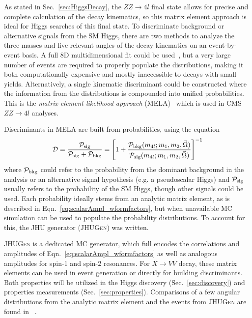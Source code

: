 As stated in Sec.~\ref{sec:HiggsDecay}, the $ZZ\rightarrow 4l$ final state allows for precise and complete calculation of the decay kinematics, so this matrix element approach is ideal for Higgs searches of this final state. To discriminate background or alternative signals from the SM Higgs, there are two methods to analyze the three masses and five relevant angles of the decay kinematics on an event-by-event basis. A full 8D multidimensional fit could be used~\cite{Chen:2014pia}, but a very large number of events are required to properly populate the distributions, making it both computationally expensive and mostly inaccessible to decays with small yields. Alternatively, a single kinematic discriminant could be constructed where the information from the distributions is compounded into unified probabilities. This is the \textit{matrix element likelihood approach} (MELA)~\cite{Gao:2010qx,Bolognesi:2012mm} which is used in CMS $ZZ\rightarrow 4l$ analyses.

Discriminants in MELA are built from probabilities, using the equation
\begin{equation}
\mathcal{D} = \frac{\mathcal{P}_{\rm{sig}}}{\mathcal{P}_{\rm{sig}} + \mathcal{P}_{\rm{bkg}}} = \left[1+ \frac{\mathcal{P}_{\rm{bkg}}(m_{4l};m_1,m_2,\vec{\Omega})}{\mathcal{P}_{\rm{sig}}(m_{4l};m_1,m_2,\vec{\Omega})}\right]^{-1}
\label{eq:MELADisc}
\end{equation}
where $\mathcal{P}_{\rm{bkg}}$ could refer to the probability from the dominant background in the analysis or an alternative signal hypothesis (e.g. a pseudoscalar Higgs) and $\mathcal{P}_{\rm{sig}}$ usually refers to the probability of the SM Higgs, though other signals could be used. Each probability ideally stems from an analytic matrix element, as is described in Eqn.~\ref{eq:scalarAmpl_wformfactors}, but when unavailable MC simulation can be used to populate the probability distributions. To account for this, the \textsc{JHU} generator (\textsc{JHUGen}) was written.

\textsc{JHUGen} is a dedicated MC generator, which full encodes the correlations and amplitudes of Eqn.~\ref{eq:scalarAmpl_wformfactors} as well as analogous amplitudes for spin-1 and spin-2 resonances. For $X\rightarrow VV$ decay, these matrix elements can be used in event generation or directly for building discriminants. Both properties will be utilized in the Higgs discovery (Sec.~\ref{sec:discovery}) and properties measurements (Sec.~\ref{sec:properties}). Comparisons of a few angular distributions from the analytic matrix element and the events from \textsc{JHUGen} are found in ~\cite{Bolognesi:2012mm}.

